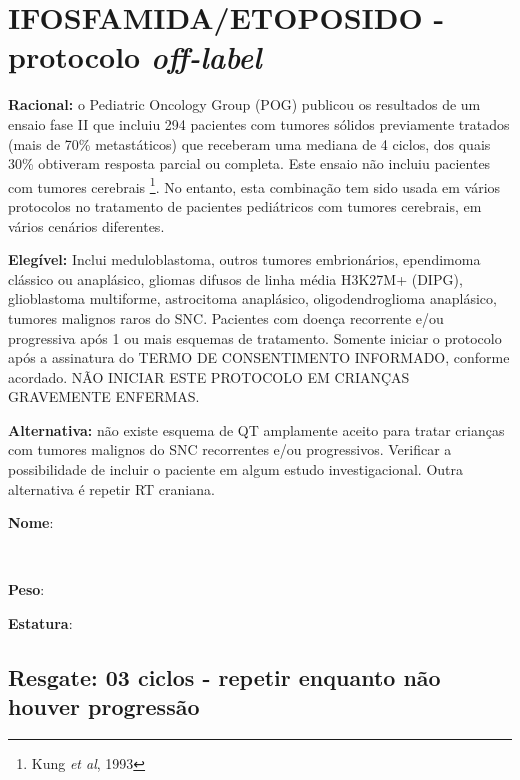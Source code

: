 \documentclass[11pt,a4paper,oldfontcommands]{memoir}
\def\entrywithlabel[#1]#2{\parbox{#1}{{\small #2:} \hrulefill}}
\begin{document}
\cleardoublepage
\section{IFOSFAMIDA/ETOPOSIDO - protocolo \textit{off-label}}
{\let\thefootnote\relax{}}
\textbf{Racional:} o Pediatric Oncology Group (POG) publicou os resultados de um ensaio fase II que incluiu 294 pacientes com tumores sólidos previamente tratados (mais de 70\% metastáticos) que receberam uma mediana de 4 ciclos, dos quais 30\% obtiveram resposta parcial ou completa. Este ensaio não incluiu pacientes com tumores cerebrais \footnote{Kung \textit{et al}, 1993}. No entanto, esta combinação tem sido usada em vários protocolos no tratamento de pacientes pediátricos com tumores cerebrais, em vários cenários diferentes.

\textbf{Elegível:} Inclui meduloblastoma, outros tumores embrionários, ependimoma clássico ou anaplásico, gliomas difusos de linha média H3K27M+ (DIPG), glioblastoma multiforme, astrocitoma anaplásico, oligodendroglioma anaplásico, tumores malignos raros do SNC. Pacientes com doença recorrente e/ou progressiva após 1 ou mais esquemas de tratamento. Somente iniciar o protocolo após a assinatura do TERMO DE CONSENTIMENTO INFORMADO, conforme acordado. NÃO INICIAR ESTE PROTOCOLO EM CRIANÇAS GRAVEMENTE ENFERMAS.

\textbf{Alternativa:} não existe esquema de QT amplamente aceito para tratar crianças com tumores malignos do SNC recorrentes e/ou progressivos. Verificar a possibilidade de incluir o paciente em algum estudo investigacional. Outra alternativa é repetir RT craniana.
\\[0.4cm]
\entrywithlabel[1\hsize]{\textbf{Nome}}\hfill
\\[0.3cm]
\entrywithlabel[.45\hsize]{\textbf{Peso}}\hfill  \entrywithlabel[.45\hsize]{\textbf{Estatura}}

\subsection{Resgate: 03 ciclos - repetir enquanto não houver progressão}
\end{document}
